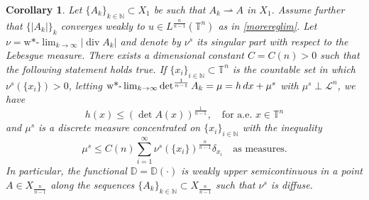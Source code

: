 \documentclass[10pt,reqno]{amsart}
\numberwithin{equation}{section}
\newcommand{\T}{\mathbb{T}}
\newcommand{\N}{\mathbb{N}}
\newcommand{\D}{\mathbb{D}}
\DeclareMathOperator{\dv}{div}
\theoremstyle{plain}
\newtheorem{Cor}[Teo]{Corollary}
\theoremstyle{definition}
\theoremstyle{remark}
\begin{document}
 \begin{Cor}\label{intro:full_USC}
Let $\{A_k\}_{k\in \N}\subset X_1$ be such that $A_k\rightharpoonup A$ in $X_1$. Assume further that $\{|A_k|\}_k$ converges weakly to $u \in L^\frac{n}{n-1}(\T^n)$ as in \eqref{morereglim}.  Let $\nu=\text{w*-}\lim_{k\rightarrow \infty} |\dv A_k |$ and denote by $\nu^s$ its singular part with respect to the Lebesgue measure. There exists a dimensional constant $C= C(n)> 0$ such that the following statement holds true. If $\{x_i\}_{i\in \N}\subset \T^n$ is the countable set in which $\nu^s(\{x_i\})>0$, letting $\text{w\\
*-}\lim_{k\rightarrow \infty}\det^\frac{1}{n-1} A_k=\mu =h\,dx+\mu^s$ with $\mu^s\perp \mathcal{L}^n$, we have
$$
h(x)\leq \left( \det A(x)\right)^\frac{1}{n-1},\quad \text{for a.e.  } x\in \T^n
$$
and $\mu^s$ is a discrete measure concentrated on $\{x_i\}_{i\in \N}$ with the inequality
\begin{equation}\label{mu_sing_bound_nu_sing}
\mu^s\leq C(n) \sum_{i=1}^\infty \nu^s(\{x_i\})^\frac{n}{n-1}\delta_{x_i}\quad \text{as measures}.
\end{equation}
In particular, the functional $\D=\D(\cdot)$ is weakly upper semicontinuous in a point $A\in X_\frac{n}{n-1}$ along the sequences $\{A_k\}_{k\in \N}\subset X_\frac{n}{n-1}$ such that $\nu^s$ is diffuse.
\end{Cor}
\end{document}
